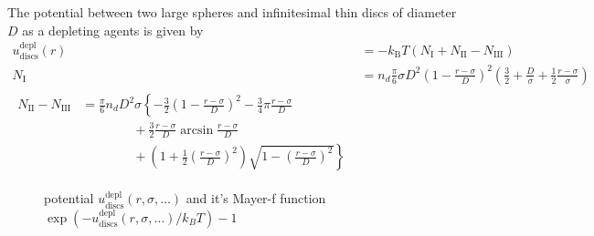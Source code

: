 The potential between two large spheres and infinitesimal thin discs of diameter $D$
as a depleting agents is given by
\begin{align}
u^\text{depl}_\text{discs}(r) &= -k_\text{B} T (N_\text{I}+N_\text{II}-N_\text{III}) \\
N_\text{I} &= n_d \frac{\pi}{6}\sigma D^2 \left(1-\frac{r-\sigma}{D}\right)^2
                \left(\frac{3}{2}+\frac{D}{\sigma}+\frac{1}{2}\frac{r-\sigma}{\sigma}\right)\\
\begin{split}
N_\text{II} - N_\text{III} &= \frac{\pi}{6} n_d D^2\sigma
                              \left\{ -\frac{3}{2}\left(1-\frac{r-\sigma}{D}\right)^2
                                      -\frac{3}{4}\pi\frac{r-\sigma}{D} \right. \\
                           & \qquad \qquad + \frac{3}{2}\frac{r-\sigma}{D} \arcsin \frac{r-\sigma}{D}  \\
                           & \qquad \qquad + \left.
                              \left(1+\frac{1}{2}\left(\frac{r-\sigma}{D}\right)^2\right)
                                   \sqrt{1-\left(\frac{r-\sigma}{D}\right)^2}
                              \right\}
\end{split}
\end{align}

\begin{figure}[htb]
\centering
  \quad
  \caption{potential $u^\text{depl}_\text{discs}(r,\sigma,\ldots)$ and it's Mayer-f function $\exp(-u^\text{depl}_\text{discs}(r,\sigma,\ldots)/k_BT)-1$}
\end{figure}

